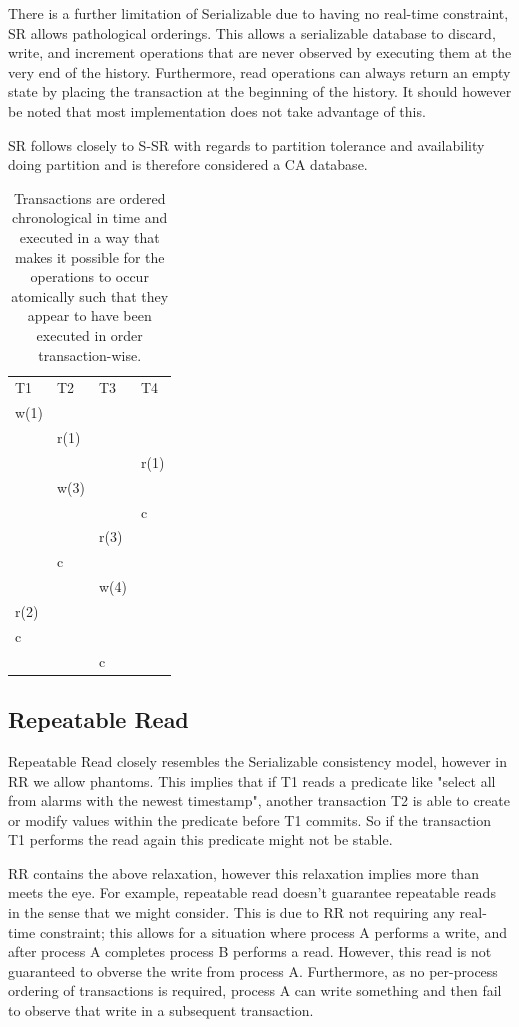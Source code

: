 \documentclass[a4paper,10pt,titlepage]{report}
\begin{document}
There is a further limitation of Serializable due to having no real-time constraint, SR allows pathological orderings. This allows a serializable database to discard, write, and increment operations that are never observed by executing them at the very end of the history. Furthermore, read operations can always return an empty state by placing the transaction at the beginning of the history. It should however be noted that most implementation does not take advantage of this.

SR follows closely to S-SR with regards to partition tolerance and availability doing partition and is therefore considered a CA database.

\begin{table}[h]
\begin{tabular}{l|l|l|l}
T1   & T2   & T3   & T4   \\
w(1) &      &      &      \\
     & r(1) &      &      \\
     &      &      & r(1) \\
     & w(3) &      &      \\
     &      &      & c    \\
     &      & r(3) &      \\
     & c    &      &      \\
     &      & w(4) &      \\
r(2) &      &      &      \\
c    &      &      &      \\
     &      & c    &      
\end{tabular}
\caption{Transactions are ordered chronological in time and executed in a way that makes it possible for the operations to occur atomically such that they appear to have been executed in order transaction-wise. }
\end{table}
\newpage
\subsection{Repeatable Read}

Repeatable Read closely resembles the Serializable consistency model, however in RR we allow phantoms. This implies that if T1 reads a predicate like "select all from alarms with the newest timestamp", another transaction T2 is able to create or modify values within the predicate before T1 commits. So if the transaction T1 performs the read again this predicate might not be stable. 

RR contains the above relaxation, however this relaxation implies more than meets the eye. For example, repeatable read doesn't guarantee repeatable reads in the sense that we might consider. This is due to RR not requiring any real-time constraint; this allows for a situation where process A performs a write, and  after process A completes process B performs a read. However, this read is not guaranteed to obverse the write from process A. Furthermore, as no per-process ordering of transactions is required, process A can write something and then fail to observe that write in a subsequent transaction. 
\end{document}
